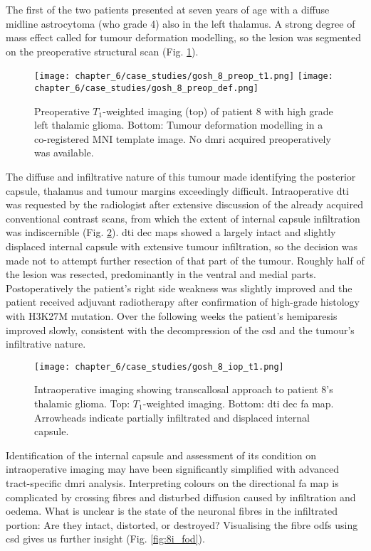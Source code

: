 The first of the two patients presented at seven years of age with a diffuse midline astrocytoma (\gls{who} grade 4) also in the left thalamus.
A strong degree of mass effect called for tumour deformation modelling, so the lesion was segmented on the preoperative structural scan (Fig. \ref{fig:8p}).

\begin{figure}[htb!]
  \centering
  \texttt{[image: chapter\_6/case\_studies/gosh\_8\_preop\_t1.png]}
  \texttt{[image: chapter\_6/case\_studies/gosh\_8\_preop\_def.png]}
  \caption{Preoperative $T_1$-weighted imaging (top) of patient 8 with high grade left thalamic glioma. Bottom: Tumour deformation modelling in a co-registered MNI template image. No \gls{dmri} acquired preoperatively was available.}
  \label{fig:8p}
\end{figure}

The diffuse and infiltrative nature of this tumour made identifying the posterior capsule, thalamus and tumour margins exceedingly difficult.
Intraoperative \gls{dti} was requested by the radiologist after extensive discussion of the already acquired conventional contrast scans, from which the extent of internal capsule infiltration was indiscernible (Fig. \ref{fig:8i}).
\Gls{dti} \gls{dec} maps showed a largely intact and slightly displaced internal capsule with extensive tumour infiltration, so the decision was made not to attempt further resection of that part of the tumour.
Roughly half of the lesion was resected, predominantly in the ventral and medial parts.
Postoperatively the patient's right side weakness was slightly improved and the patient received adjuvant radiotherapy after confirmation of high-grade histology with H3K27M mutation.
Over the following weeks the patient's hemiparesis improved slowly, consistent with the decompression of the \gls{csd} and the tumour's infiltrative nature.

\begin{figure}
  \centering
  \texttt{[image: chapter\_6/case\_studies/gosh\_8\_iop\_t1.png]}
  
  \caption{Intraoperative imaging showing transcallosal approach to patient 8's thalamic glioma. Top: $T_1$-weighted imaging. Bottom: \gls{dti} \gls{dec} \gls{fa} map. Arrowheads indicate partially infiltrated and displaced internal capsule.}
  \label{fig:8i}
\end{figure}

Identification of the internal capsule and assessment of its condition on intraoperative imaging may have been significantly simplified with advanced tract-specific \gls{dmri} analysis.
Interpreting colours on the directional \gls{fa} map is complicated by crossing fibres and disturbed diffusion caused by infiltration and oedema.
What is unclear is the state of the neuronal fibres in the infiltrated portion: Are they intact, distorted, or destroyed?
Visualising the fibre \glspl{odf} using \gls{csd} gives us further insight (Fig. \ref{fig:8i_fod}).


